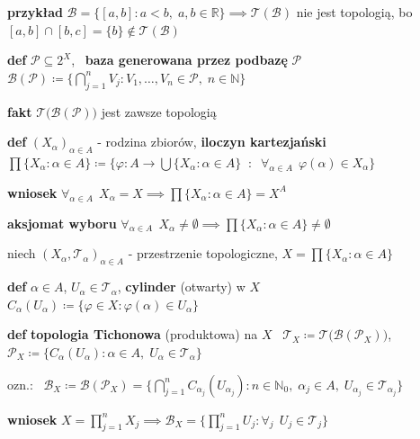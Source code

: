 \documentclass[a4paper,12pt]{article}
\begin{document}
\bigskip
\begin{logbox}
\textbf{przykład} \; \(\mathcal{B} = \{[a, b] : a < b, \; a, b \in \mathbb{R}\} \implies \mathcal{T}(\mathcal{B})\) nie jest topologią, bo \([a, b] \cap [b, c] = \{b\} \notin \mathcal{T}(\mathcal{B})\)
\end{logbox}

\bigskip
\textbf{def} \; \(\mathcal{P} \subseteq 2^X\), \, \textbf{baza generowana przez podbazę} \(\mathcal{P}\) \, \(\mathcal{B}(\mathcal{P}) \coloneqq \{\bigcap_{j=1}^{n} V_j : V_1, \dots, V_n \in \mathcal{P}, \; n \in \mathbb{N}\}\)

\smallskip
\textbf{fakt} \; \(\mathcal{T}\big(\mathcal{B}(\mathcal{P})\big)\) jest zawsze topologią

\bigskip
\textbf{def} \; \((X_\alpha)_{\alpha \in A}\) - rodzina zbiorów, \; \textbf{iloczyn kartezjański} \, \(\prod \{X_\alpha : \alpha \in A\} \coloneqq \{\varphi : A \to \bigcup \{X_\alpha : \alpha \in A\} \;\; : \;\; \forall_{\alpha \in A} \;\, \varphi(\alpha) \in X_\alpha\}\)

\smallskip
\textbf{wniosek} \; \(\forall_{\alpha \in A} \;\, X_\alpha = X \implies \prod \{X_\alpha : \alpha \in A\} = X^A\)

\bigskip
\textbf{aksjomat wyboru} \; \(\forall_{\alpha \in A} \;\, X_\alpha \neq \emptyset \implies \prod \{X_\alpha : \alpha \in A\} \neq \emptyset\)


\bigskip
\bigskip
{}

\bigskip
niech \((X_\alpha, \mathcal{T}_\alpha)_{\alpha \in A}\) - przestrzenie topologiczne, \; \(X = \prod \{X_\alpha : \alpha \in A\}\)

\bigskip
\textbf{def} \; \(\alpha \in A\), \; \(U_\alpha \in \mathcal{T}_\alpha\), \; \textbf{cylinder} (otwarty) w \(X\) \, \(C_\alpha(U_\alpha) \coloneqq \{\varphi \in X : \varphi(\alpha) \in U_\alpha\}\)

\bigskip
\textbf{def} \; \textbf{topologia Tichonowa} (produktowa) na \(X\) \, \(\mathcal{T}_X \coloneqq \mathcal{T}\big(\mathcal{B}(\mathcal{P}_X)\big)\), \;\; \(\mathcal{P}_X \coloneqq \{C_\alpha(U_\alpha) : \alpha \in A, \; U_\alpha \in \mathcal{T}_\alpha\}\)

\smallskip
ozn.: \, \(\mathcal{B}_X \coloneqq \mathcal{B}(\mathcal{P}_X) = \{\bigcap_{j=1}^{n} C_{\alpha_j}(U_{\alpha_j}) : n \in \mathbb{N}_0, \; \alpha_j \in A, \; U_{\alpha_j} \in \mathcal{T}_{\alpha_j}\}\)

\smallskip
\textbf{wniosek} \; \(X = \prod_{j=1}^{n} X_j \implies \mathcal{B}_X = \{\prod_{j=1}^{n} U_j : \forall_j \;\, U_j \in \mathcal{T}_j\}\)
\end{document}
